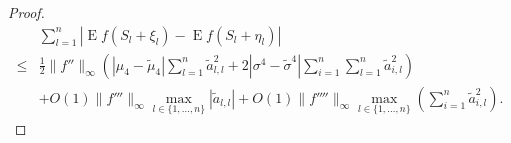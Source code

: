 \documentclass[11pt]{article}
\DeclareMathOperator{\myE}{E}
\theoremstyle{plain}
\theoremstyle{definition}
\theoremstyle{remark}
\begin{document}
\begin{appendices}
\begin{proof}
    \begin{equation*}
        \begin{split}
             &
             \sum_{l=1}^n \left| \myE f(S_{l}+\xi_{l})-\myE f(S_{l}+\eta_{l})\right|
             \\
\leq&
\frac{1}{2}
\|f''\|_\infty
\left(
\left|
            \mu_4
            -
            \tilde \mu_4
\right|
\sum_{l=1}^n \tilde a_{l,l}^2
        +2|\sigma^4 - \tilde \sigma^4|
        \sum_{i=1}^n \sum_{l=1}^n \tilde a_{i,l}^2    \right)
        \\
            &+
            O(1) \|f'''\|_{\infty}
            \max_{l\in\{1,\ldots,n\}} |\tilde a_{l,l}|
            +
            O(1) \|f'''' \|_{\infty} 
                \max_{l\in\{1,\ldots, n\}}
            \left(
   \sum_{i=1}^n \tilde a_{i,l}^2 
        \right)
            .
        \end{split}
    \end{equation*}

 
\end{proof}


\end{appendices}





\end{document}

